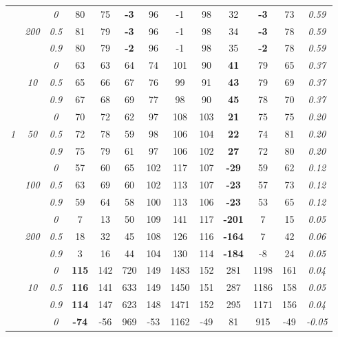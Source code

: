 \begin{table}
\begin{center}
\begin{tabular}{ccc|cc|cc|cc|cc|c|c}
\cline{2-3}\rule{0pt}{3ex}
& & \it  0  & 80 & 75 & {\bf -3} & 96 & -1 & 98 & 32 & {\bf -3} & 73 & \it  0.59 \\
 & \it  200  & \it  0.5  & 81 & 79 & {\bf -3} & 96 & -1 & 98 & 34 & {\bf -3} & 78 & \it  0.59 \\
& & \it  0.9  & 80 & 79 & {\bf -2} & 96 & -1 & 98 & 35 & {\bf -2} & 78 & \it  0.59 \\
\hline\rule{0pt}{3ex}
& & \it  0  & 63 & 63 & 64 & 74 & 101 & 90 & {\bf 41} & 79 & 65 & \it  0.37 \\
 & \it  10  & \it  0.5  & 65 & 66 & 67 & 76 & 99 & 91 & {\bf 43} & 79 & 69 & \it  0.37 \\
& & \it  0.9  & 67 & 68 & 69 & 77 & 98 & 90 & {\bf 45} & 78 & 70 & \it  0.37 \\[1ex]
\cline{2-3}\rule{0pt}{3ex}
& & \it  0  & 70 & 72 & 62 & 97 & 108 & 103 & {\bf 21} & 75 & 75 & \it  0.20 \\
\it  1  & \it  50  & \it  0.5  & 72 & 78 & 59 & 98 & 106 & 104 & {\bf 22} & 74 & 81 & \it  0.20 \\
& & \it  0.9  & 75 & 79 & 61 & 97 & 106 & 102 & {\bf 27} & 72 & 80 & \it  0.20 \\[1ex]
\cline{2-3}\rule{0pt}{3ex}
& & \it  0  & 57 & 60 & 65 & 102 & 117 & 107 & {\bf -29} & 59 & 62 & \it  0.12 \\
 & \it  100  & \it  0.5  & 63 & 69 & 60 & 102 & 113 & 107 & {\bf -23} & 57 & 73 & \it  0.12 \\
& & \it  0.9  & 59 & 64 & 58 & 100 & 113 & 106 & {\bf -23} & 53 & 65 & \it  0.12 \\[1ex]
\cline{2-3}\rule{0pt}{3ex}
& & \it  0  & 7 & 13 & 50 & 109 & 141 & 117 & {\bf -201} & 7 & 15 & \it  0.05 \\
 & \it  200  & \it  0.5  & 18 & 32 & 45 & 108 & 126 & 116 & {\bf -164} & 7 & 42 & \it  0.06 \\
& & \it  0.9  & 3 & 16 & 44 & 104 & 130 & 114 & {\bf -184} & -8 & 24 & \it  0.05 \\
\hline\rule{0pt}{3ex}
& & \it  0  & {\bf 115} & 142 & 720 & 149 & 1483 & 152 & 281 & 1198 & 161 & \it  0.04 \\
 & \it  10  & \it  0.5  & {\bf 116} & 141 & 633 & 149 & 1450 & 151 & 287 & 1186 & 158 & \it  0.05 \\
& & \it  0.9  & {\bf 114} & 147 & 623 & 148 & 1471 & 152 & 295 & 1171 & 156 & \it  0.04 \\[1ex]
\cline{2-3}\rule{0pt}{3ex}
& & \it  0  & {\bf -74} & -56 & 969 & -53 & 1162 & -49 & 81 & 915 & -49 & \it  -0.05 \\

\end{tabular}
\end{center}
\end{table}
